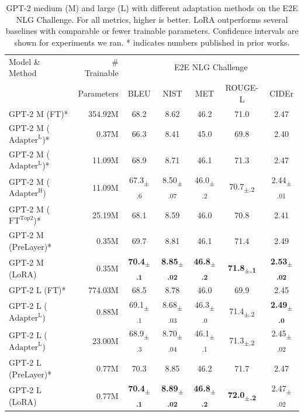 \begin{table}[t]
\centering
\begin{tabular}{l|r|ccccc}
\hline
\toprule
Model \& Method & \# Trainable & \multicolumn{5}{c}{E2E NLG Challenge} \\
       & Parameters & BLEU & NIST & MET & ROUGE-L & CIDEr \\
\midrule
GPT-2 M (FT)* & 354.92M                         & 68.2 &	8.62 &	46.2 &	71.0 &	2.47  \\
GPT-2 M ($\text{Adapter}^{\text{L}}$)* & 0.37M  & 66.3 &	8.41 &	45.0 &	69.8 &	2.40  \\
GPT-2 M ($\text{Adapter}^{\text{L}}$)* & 11.09M & 68.9 &	8.71 &	46.1 &	71.3 &	2.47  \\
GPT-2 M ($\text{Adapter}^{\text{H}}$) & 11.09M & 67.3\textsubscript{$\pm$.6} & 8.50\textsubscript{$\pm$.07}	& 46.0\textsubscript{$\pm$.2} & 70.7\textsubscript{$\pm$.2}	& 2.44\textsubscript{$\pm$.01}        \\
GPT-2 M ($\text{FT}^{\text{Top2}}$)*   & 25.19M & 68.1 & 8.59 & 46.0  &  70.8 & 2.41  \\
GPT-2 M (PreLayer)* & 0.35M & 69.7 & 8.81 & 46.1 & 71.4 & 2.49  \\
GPT-2 M (LoRA) & 0.35M & \textbf{70.4\textsubscript{$\pm$.1}} & \textbf{8.85\textsubscript{$\pm$.02}} & \textbf{46.8\textsubscript{$\pm$.2}} & \textbf{71.8\textsubscript{$\pm$.1}} & \textbf{2.53\textsubscript{$\pm$.02}} \\
\midrule
GPT-2 L (FT)* & 774.03M & 68.5 & 8.78 & 46.0 & 69.9 & 2.45  \\
GPT-2 L ($\text{Adapter}^{\text{L}}$) & 0.88M  & 69.1\textsubscript{$\pm$.1} & 8.68\textsubscript{$\pm$.03} & 46.3\textsubscript{$\pm$.0} & 71.4\textsubscript{$\pm$.2} &	\textbf{2.49\textsubscript{$\pm$.0}}  \\
GPT-2 L ($\text{Adapter}^{\text{L}}$) & 23.00M & 68.9\textsubscript{$\pm$.3} & 8.70\textsubscript{$\pm$.04} & 46.1\textsubscript{$\pm$.1} & 71.3\textsubscript{$\pm$.2} &   2.45\textsubscript{$\pm$.02}  \\
GPT-2 L (PreLayer)* & 0.77M & 70.3 & 8.85 & 46.2 & 71.7 & 2.47  \\
GPT-2 L (LoRA) & 0.77M & \textbf{70.4\textsubscript{$\pm$.1}} & \textbf{8.89\textsubscript{$\pm$.02}} & \textbf{46.8\textsubscript{$\pm$.2}} & \textbf{72.0\textsubscript{$\pm$.2}} & 2.47\textsubscript{$\pm$.02} \\
\bottomrule
\end{tabular}
\caption{GPT-2 medium (M) and large (L) with different adaptation methods on the E2E NLG Challenge. For all metrics, higher is better. LoRA outperforms several baselines with comparable or fewer trainable parameters. Confidence intervals are shown for experiments we ran. * indicates numbers published in prior works.
}
\label{tab:gpt2_ft_results}
\end{table}










